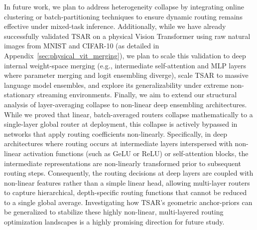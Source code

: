 In future work, we plan to address heterogeneity collapse by integrating online clustering or
batch-partitioning techniques to ensure dynamic routing remains effective under mixed-task
inference. Additionally, while we have already successfully validated TSAR on a physical Vision
Transformer using raw natural images from MNIST and CIFAR-10 (as detailed in Appendix~\ref{sec:physical_vit_merging}),
we plan to scale this validation to deep internal weight-space merging (e.g., intermediate self-attention
and MLP layers where parameter merging and logit ensembling diverge), scale TSAR to massive
language model ensembles, and explore its generalizability under extreme non-stationary streaming
environments. Finally, we aim to extend our structural analysis of layer-averaging collapse to
non-linear deep ensembling architectures. While we proved that linear, batch-averaged routers
collapse mathematically to a single-layer global router at deployment, this collapse is actively
bypassed in networks that apply routing coefficients non-linearly. Specifically, in deep
architectures where routing occurs at intermediate layers interspersed with non-linear activation
functions (such as GeLU or ReLU) or self-attention blocks, the intermediate representations are
non-linearly transformed prior to subsequent routing steps. Consequently, the routing decisions at
deep layers are coupled with non-linear features rather than a simple linear head, allowing
multi-layer routers to capture hierarchical, depth-specific routing functions that cannot be reduced
to a single global average. Investigating how TSAR's geometric anchor-priors can be generalized to
stabilize these highly non-linear, multi-layered routing optimization landscapes is a highly
promising direction for future study.